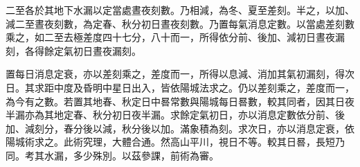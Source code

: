 \begin{pinyinscope}
 二至各於其地下水漏以定當處晝夜刻數。乃相減，為冬、夏至差刻。半之，以加、減二至晝夜刻數，為定春、秋分初日晝夜刻數。乃置每氣消息定數。以當處差刻數乘之，如二至去極差度四十七分，八十而一，所得依分前、後加、減初日晝夜漏刻，各得餘定氣初日晝夜漏刻。



 置每日消息定衰，亦以差刻乘之，差度而一，所得以息減、消加其氣初漏刻，得次日。其求距中度及昏明中星日出入，皆依陽城法求之。仍以差刻乘之，差度而一，為今有之數。若置其地春、秋定日中晷常數與陽城每日晷數，較其同者，因其日夜半漏亦為其地定春、秋分初日夜半漏。求餘定氣初日，亦以消息定數依分前、後加、減刻分，春分後以減，秋分後以加。滿象積為刻。求次日，亦以消息定衰，依陽城術求之。此術究理，大體合通。然高山平川，視日不等。較其日晷，長短乃同。考其水漏，多少殊別。以茲參課，前術為審。



\end{pinyinscope}